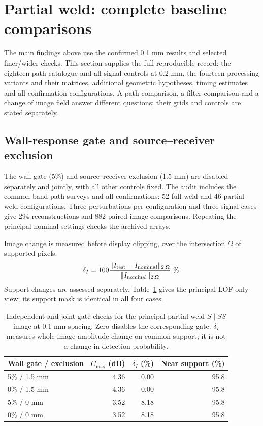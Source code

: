 \documentclass[11pt]{article}
\begin{document}
\section{Partial weld: complete baseline comparisons}

\label{saft:archive:partial:complete}
The main findings above use the confirmed 0.1 mm results and selected finer/wider checks. This section supplies the full reproducible record: the eighteen-path catalogue and all signal controls at 0.2 mm, the fourteen processing variants and their matrices, additional geometric hypotheses, timing estimates and all confirmation configurations. A path comparison, a filter comparison and a change of image field answer different questions; their grids and controls are stated separately.

\subsection{Wall-response gate and source--receiver exclusion}
\label{saft:archive:partial:gate_audit}
The wall gate (5\%) and source--receiver exclusion (1.5 mm) are disabled separately and jointly, with all other controls fixed. The audit includes the common-band path surveys and all confirmations: 52 full-weld and 46 partial-weld configurations. Three perturbations per configuration and three signal cases give 294 reconstructions and 882 paired image comparisons. Repeating the principal nominal settings checks the archived arrays.

Image change is measured before display clipping, over the intersection $\Omega$ of supported pixels:
\begin{equation}
 \delta_I=100\frac{\lVert I_{\rm test}-I_{\rm nominal}\rVert_{2,\Omega}}
 {\lVert I_{\rm nominal}\rVert_{2,\Omega}}\ \%.
\end{equation}
Support changes are assessed separately. Table~\ref{saft:archive:partial:gate_controls} gives the principal LOF-only view; its support mask is identical in all four cases.

\begin{table}[htbp]\centering\small
\caption{Independent and joint gate checks for the principal
partial-weld $S\mid SS${}
image at 0.1 mm spacing. Zero disables the corresponding gate. $\delta_I$ measures whole-image amplitude change on common support; it is not a change in detection probability.}
\label{saft:archive:partial:gate_controls}
\begin{tabular}{@{}lrrr@{}}\toprule
Wall gate / exclusion & $C_{\max}$ (dB) & $\delta_I$ (\%) & Near support (\%)\\\midrule
5\% / 1.5 mm & 4.36 & 0.00 & 95.8 \\
0\% / 1.5 mm & 4.36 & 0.00 & 95.8 \\
5\% / 0 mm & 3.52 & 8.18 & 95.8 \\
0\% / 0 mm & 3.52 & 8.18 & 95.8 \\

\bottomrule\end{tabular}
\end{table}
\end{document}
